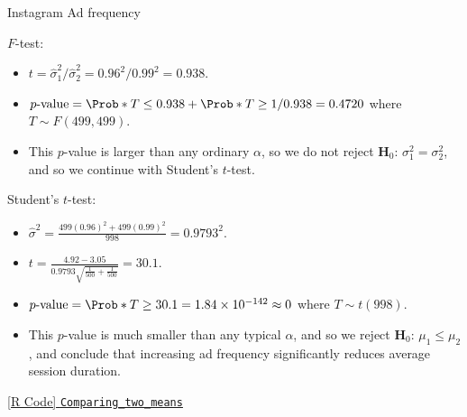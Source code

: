 \begin{Example}{Instagram Ad frequency}{}
\begin{framed}
            $ F $-test:
            \begin{itemize}
                  \item $ t=\hat{\sigma}_1^2/\hat{\sigma}_2^2=0.96^2/0.99^2=0.938 $.
                  \item $ p\text{-value}=\Prob*{T\le 0.938}+\Prob*{T\ge 1/0.938}=0.4720 $
                        where $ T \sim F(499,499) $.
                  \item This $ p $-value is larger than any ordinary $ \alpha $, so
                        we do not reject $ \mathbf{H}_0 $: $ \sigma_1^2=\sigma_2^2 $, and so we continue
                        with Student's $ t $-test.
            \end{itemize}
      \end{framed}
      \begin{framed}
            Student's $ t $-test:
            \begin{itemize}
                  \item $ \displaystyle \hat{\sigma}^2=\frac{499(0.96)^2+499(0.99)^2}{998}=0.9793^2 $.
                  \item $ \displaystyle t=\frac{4.92-3.05}{0.9793\sqrt{\frac{1}{500} +\frac{1}{500} }}=30.1  $.
                  \item $ p\text{-value}=\Prob*{T\ge 30.1}=1.84\times 10^{-142}\approx 0 $ where $ T \sim t(998) $.
                  \item This $ p $-value is much smaller than any typical $ \alpha $, and so we reject
                        $ \mathbf{H}_0 $: $ \mu_1\le \mu_2 $, and conclude that increasing ad frequency significantly
                        reduces average session duration.
            \end{itemize}
      \end{framed}
      \href{https://github.com/Hextical/university-notes/blob/master/year-3/semester-3/STAT 430/code/W2/Comparing_two_means.R}{[R Code] \texttt{Comparing\_two\_means}}
\end{Example}
